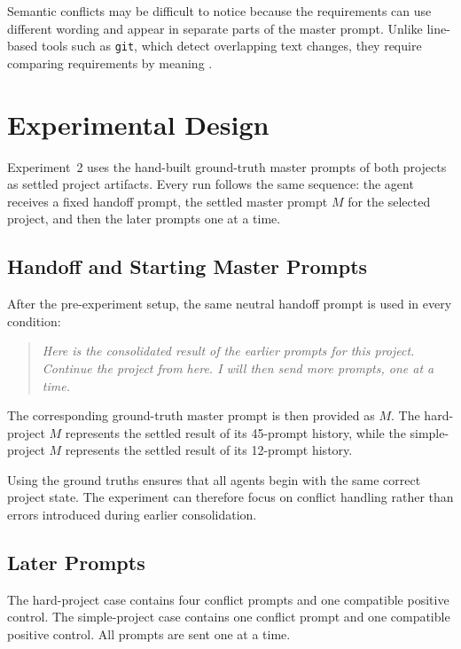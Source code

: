 Semantic conflicts may be difficult to notice because the requirements can use
different wording and appear in separate parts of the master prompt. Unlike
line-based tools such as \texttt{git}, which detect overlapping text changes,
they require comparing requirements by meaning
\citep{pugachev2025codecrdt}.

\section{Experimental Design}
\label{sec:conflict-data}

Experiment~2 uses the hand-built ground-truth master prompts of both projects
as settled project artifacts. Every run follows the same sequence: the agent
receives a fixed handoff prompt, the settled master prompt \(M\) for the
selected project, and then the later prompts one at a time.

\subsection{Handoff and Starting Master Prompts}

After the pre-experiment setup, the same neutral handoff prompt is used in
every condition:

\begin{quote}
\emph{Here is the consolidated result of the earlier prompts for this project.
Continue the project from here. I will then send more prompts, one at a time.}
\end{quote}

The corresponding ground-truth master prompt is then provided as \(M\). The
hard-project \(M\) represents the settled result of its 45-prompt history,
while the simple-project \(M\) represents the settled result of its 12-prompt
history.

Using the ground truths ensures that all agents begin with the same correct
project state. The experiment can therefore focus on conflict handling rather
than errors introduced during earlier consolidation.

\subsection{Later Prompts}

The hard-project case contains four conflict prompts and one compatible
positive control. The simple-project case contains one conflict prompt and one
compatible positive control. All prompts are sent one at a time.

